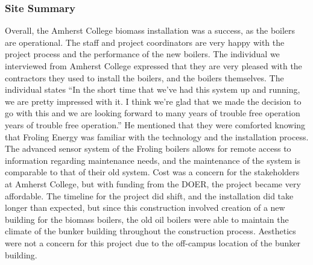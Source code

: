 \subsubsection{Site Summary}
\par Overall, the Amherst College biomass installation was a success, as the boilers are operational. The staff and project coordinators are very happy with the project process and the performance of the new boilers. The individual we interviewed from Amherst College expressed that they are very pleased with the contractors they used to install the boilers, and the boilers themselves. The individual states “In the short time that we’ve had this system up and running, we are pretty impressed with it. I think we’re glad that we made the decision to go with this and we are looking forward to many years of trouble free operation years of trouble free operation.” He mentioned that they were comforted knowing that Froling Energy was familiar with the technology and the installation process. The advanced sensor system of the Froling boilers allows for remote access to information regarding maintenance needs, and the maintenance of the system is comparable to that of their old system. Cost was a concern for the stakeholders at Amherst College, but with funding from the DOER, the project became very affordable. The timeline for the project did shift, and the installation did take longer than expected, but since this construction involved creation of a new building for the biomass boilers, the old oil boilers were able to maintain the climate of the bunker building throughout the construction process. Aesthetics were not a concern for this project due to the off-campus location of the bunker building.


